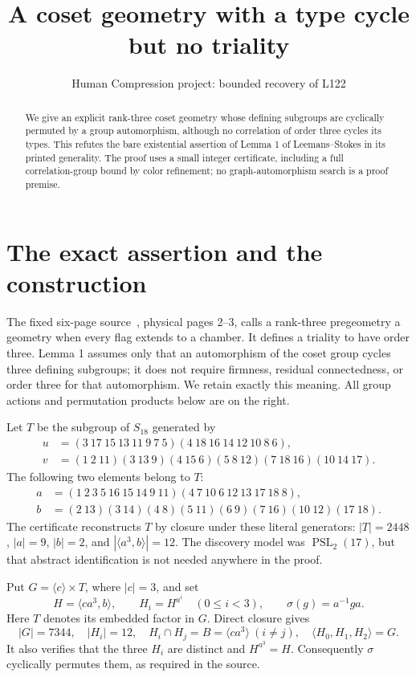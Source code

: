 \documentclass[11pt,a4paper]{article}
\title{A coset geometry with a type cycle but no triality}
\author{Human Compression project: bounded recovery of L122}\date{}
\newcommand{\gen}[1]{\langle #1\rangle}
\begin{document}
\maketitle
\begin{abstract}
We give an explicit rank-three coset geometry whose defining subgroups are
cyclically permuted by a group automorphism, although no correlation of
order three cycles its types. This refutes the bare existential assertion
of Lemma 1 of Leemans--Stokes in its printed generality. The proof uses a
small integer certificate, including a full correlation-group bound by
color refinement; no graph-automorphism search is a proof premise.
\end{abstract}

\section{The exact assertion and the construction}
The fixed six-page source~\cite{LS}, physical pages 2--3, calls a rank-three
pregeometry a geometry when every flag extends to a chamber. It defines
a triality to have order three. Lemma 1 assumes only that an automorphism
of the coset group cycles three defining subgroups; it does not require
firmness, residual connectedness, or order three for that automorphism.
We retain exactly this meaning. All group actions and permutation products
below are on the right.

Let $T$ be the subgroup of $S_{18}$ generated by
\begin{align*}
 u&=(3\ 17\ 15\ 13\ 11\ 9\ 7\ 5)(4\ 18\ 16\ 14\ 12\ 10\ 8\ 6),\\
 v&=(1\ 2\ 11)(3\ 13\ 9)(4\ 15\ 6)(5\ 8\ 12)
       (7\ 18\ 16)(10\ 14\ 17).
\end{align*}
The following two elements belong to $T$:
\begin{align*}
 a&=(1\ 2\ 3\ 5\ 16\ 15\ 14\ 9\ 11)
        (4\ 7\ 10\ 6\ 12\ 13\ 17\ 18\ 8),\\
 b&=(2\ 13)(3\ 14)(4\ 8)(5\ 11)(6\ 9)(7\ 16)(10\ 12)(17\ 18).
\end{align*}
The certificate reconstructs $T$ by closure under these literal generators:
$|T|=2448$, $|a|=9$, $|b|=2$, and $|\gen{a^3,b}|=12$.
The discovery model was $\operatorname{PSL}_2(17)$, but that abstract
identification is not needed anywhere in the proof.

Put $G=\gen c\times T$, where $|c|=3$, and set
\[
 H=\gen{ca^3,b},\qquad H_i=H^{a^i}\quad(0\leq i<3),
 \qquad \sigma(g)=a^{-1}ga.
\]
Here $T$ denotes its embedded factor in $G$. Direct closure gives
\[
 |G|=7344,\quad |H_i|=12,\quad
 H_i\cap H_j=B=\gen{ca^3}\ (i\ne j),\quad
 \gen{H_0,H_1,H_2}=G.                                      \tag{1}
\]
It also verifies that the three $H_i$ are distinct and $H^{a^3}=H$.
Consequently $\sigma$ cyclically permutes them, as required in the source.
\end{document}
